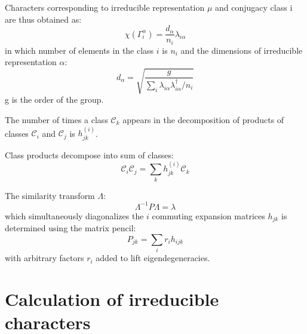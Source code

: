 \documentclass[twocolumn,showpacs,preprintnumbers,superscriptaddress,prb,floatfix,aps,10pt]{revtex4-1}
\newcommand*{\class}{\mathcal{C}}
\begin{document}
Characters corresponding to irreducible representation $\mu$ and conjugacy class i are thus obtained as:
\begin{equation}
\label{eq:irrep_characters}
\chi\left(\Gamma_i^\alpha\right) = \frac{d_\alpha}{n_i} \lambda_{i\alpha}
\end{equation}
in which number of elements in the class $i$ is $n_i$ and the dimensions of irreducible representation $\alpha$:
\begin{equation}
\label{eq:irrep_dimension}
d_\alpha = \sqrt{ \frac{g}{\sum_i \lambda_{i\alpha} \lambda_{i\alpha}^\dag / n_i }  }
\end{equation}
g is the order of the group.


The number of times a class $\class_k$ appears in the decomposition of products of classes $\class_i$ and $\class_j$ is $h_{jk}^{(i)}$. 

Class products decompose into sum of classes:
\begin{equation}
\label{eq:class_coefficients}
\class_i \class_j = \sum_k h_{jk}^{(i)} \class_k
\end{equation}



The similarity transform $\Lambda$:
\begin{equation}
\Lambda^{-1} P \Lambda = \lambda
\end{equation}
which simultaneously diagonalizes the $i$ commuting expansion matrices $h_{jk}$ is determined using the matrix pencil:
\begin{equation}
\label{eq:matrix_pencil}
P_{jk} = \sum_i r_i h_{ijk}
\end{equation}
with arbitrary factors $r_i$ added to lift eigendegeneracies.




%
%
%
\section{Calculation of irreducible characters}
\end{document}
